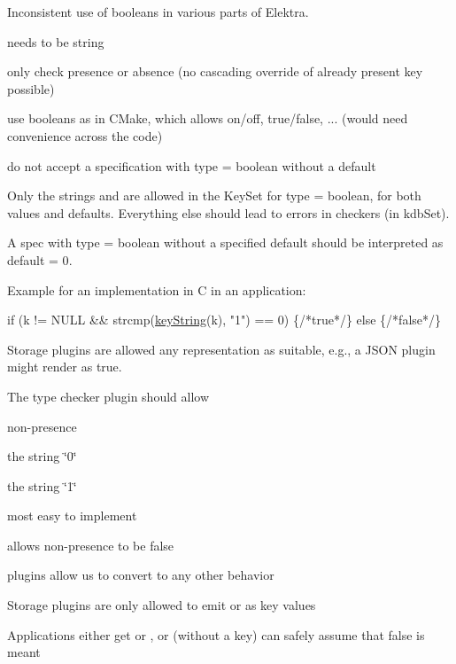 Inconsistent use of booleans in various parts of Elektra.


\begin{DoxyItemize}
\item needs to be string
\end{DoxyItemize}


\begin{DoxyItemize}
\item only check presence or absence (no cascading override of already present key possible)
\item use booleans as in C\+Make, which allows on/off, true/false, ... (would need convenience across the code)
\item do not accept a specification with {\ttfamily type = boolean} without a default
\end{DoxyItemize}

Only the strings {} and {} are allowed in the {\ttfamily Key\+Set} for {\ttfamily type = boolean}, for both values and defaults. Everything else should lead to errors in checkers (in {\ttfamily kdb\+Set}).

A spec with {\ttfamily type = boolean} without a specified default should be interpreted as {\ttfamily default = 0}.

Example for an implementation in C in an application\+:


\begin{DoxyCode}
\textcolor{keywordflow}{if} (k != NULL && strcmp(\hyperlink{group__keyvalue_ga880936f2481d28e6e2acbe7486a21d05}{keyString}(k), \textcolor{stringliteral}{"1"}) == 0) \{\textcolor{comment}{/*true*/}\} \textcolor{keywordflow}{else} \{\textcolor{comment}{/*false*/}\}
\end{DoxyCode}


Storage plugins are allowed any representation as suitable, e.\+g., a J\+S\+ON plugin might render {} as {\ttfamily true}.

The type checker plugin should allow


\begin{DoxyItemize}
\item non-\/presence
\item the string \char`\"{}0\char`\"{}
\item the string \char`\"{}1\char`\"{}
\end{DoxyItemize}


\begin{DoxyItemize}
\item most easy to implement
\item allows non-\/presence to be false
\item plugins allow us to convert to any other behavior
\end{DoxyItemize}


\begin{DoxyItemize}
\item Storage plugins are only allowed to emit {} or {} as key values
\item Applications either get {} or {}, or (without a key) can safely assume that false is meant
\end{DoxyItemize}